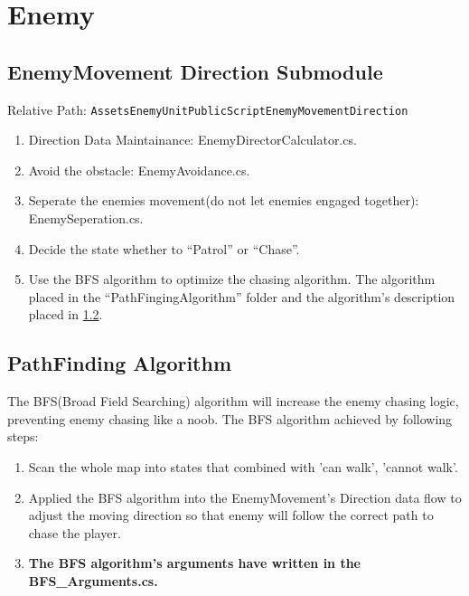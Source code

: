
\section{Enemy}   %
\subsection{EnemyMovement Direction Submodule}\label{app:c:enemy-movement}

\par \hspace{1.5em} Relative Path: \texttt{\bs Assets\bs EnemyUnit\bs PublicScript\bs EnemyMovement\bs Direction}

\begin{enumerate}
	\item Direction Data Maintainance: EnemyDirectorCalculator.cs.
	\item Avoid the obstacle: EnemyAvoidance.cs.
	\item Seperate the enemies movement(do not let enemies engaged together): EnemySeperation.cs.
	\item Decide the state whether to ``Patrol'' or ``Chase''.
	\item Use the BFS algorithm to optimize the chasing algorithm. The algorithm placed in the ``PathFingingAlgorithm'' folder and the algorithm's description placed in \ref{app:c:bfs}.
\end{enumerate}

\subsection{PathFinding Algorithm}\label{app:c:bfs}
\par\hspace{1.5em}The BFS(Broad Field Searching) algorithm will increase the enemy chasing logic, preventing enemy chasing like a noob.
	The BFS algorithm achieved by following steps:
\begin{enumerate}
	\item Scan the whole map into states that combined with 'can walk', 'cannot walk'.
	\item Applied the BFS algorithm into the EnemyMovement's Direction data flow to adjust the moving direction so that enemy will follow the correct path to chase the player.
	\item\textbf{The BFS algorithm's arguments have written in the BFS\_Arguments.cs.}
\end{enumerate}